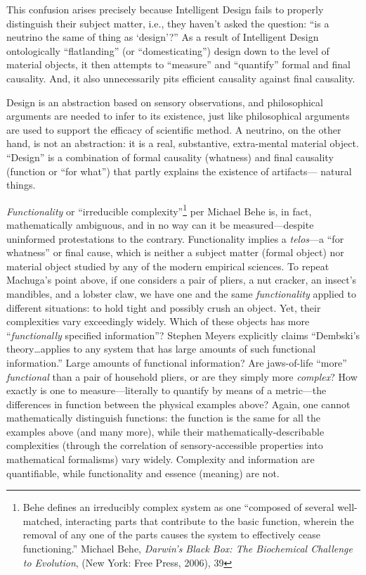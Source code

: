 This confusion arises precisely because Intelligent Design fails to properly distinguish their subject matter, i.e., they haven't asked the question: ``is a neutrino the same  of thing as `design'?'' As a result of Intelligent Design ontologically ``flatlanding'' (or ``domesticating'') design down to the level of material objects, it then attempts to ``measure'' and ``quantify'' formal and final causality. And, it also unnecessarily pits efficient causality against final causality.

Design is an abstraction based on sensory observations, and philosophical arguments are needed to infer to its existence, just like philosophical arguments are used to support the efficacy of scientific method. A neutrino, on the other hand, is not an abstraction: it is a real, substantive, extra-mental material object. ``Design'' is a combination of formal causality (whatness) and final causality (function or ``for what'') that partly explains the existence of artifacts--- natural things.

\textit{Functionality} or ``irreducible complexity''\footnote{Behe defines an irreducibly complex system as one “composed of several well-matched, interacting parts that contribute to the basic function, wherein the removal of any one of the parts causes the system to effectively cease functioning.” Michael Behe, \textit{Darwin’s Black Box: The Biochemical Challenge to Evolution}, (New York: Free Press, 2006), 39} per Michael Behe is, in fact, mathematically ambiguous, and in no way can it be measured---despite uninformed protestations to the contrary. Functionality implies a \textit{telos}---a “for whatness” or final cause, which is neither a subject matter (formal object) nor material object studied by any of the modern empirical sciences.  To repeat Machuga's point above, if one considers a pair of pliers, a nut cracker, an insect's mandibles, and a lobster claw, we have one and the same \textit{functionality} applied to different situations: to hold tight and possibly crush an object. Yet, their complexities vary exceedingly widely. Which of these objects has more ``\textit{functionally} specified information''? Stephen Meyers explicitly claims ``Dembski's theory\ldots applies to any system that has large amounts of such functional information.''\cite[pg.~372]{sigcell} Large amounts of functional information? Are jaws-of-life ``more'' \textit{functional} than a pair of household pliers, or are they simply more \textit{complex}?  How exactly is one to measure---literally to quantify by means of a metric---the differences in function between the physical examples above? Again, one cannot mathematically distinguish functions: the function is the same for all the examples above (and many more), while their mathematically-describable complexities (through the correlation of sensory-accessible properties into mathematical formalisms) vary widely.  Complexity and information are quantifiable, while functionality and essence (meaning) are not.

